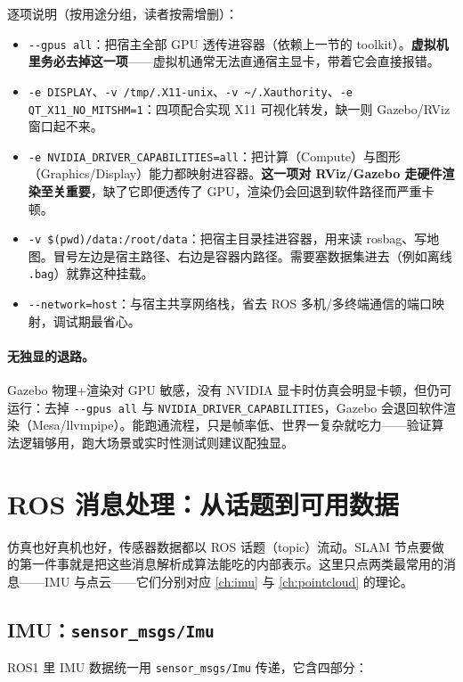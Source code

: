 逐项说明（按用途分组，读者按需增删）：

\begin{itemize}
  \item \verb|--gpus all|：把宿主全部 GPU 透传进容器（依赖上一节的 toolkit）。\textbf{虚拟机里务必去掉这一项}——虚拟机通常无法直通宿主显卡，带着它会直接报错。
  \item \verb|-e DISPLAY|、\verb|-v /tmp/.X11-unix|、\verb|-v ~/.Xauthority|、\verb|-e QT_X11_NO_MITSHM=1|：四项配合实现 X11 可视化转发，缺一则 Gazebo/RViz 窗口起不来。
  \item \verb|-e NVIDIA_DRIVER_CAPABILITIES=all|：把计算（Compute）与图形（Graphics/Display）能力都映射进容器。\textbf{这一项对 RViz/Gazebo 走硬件渲染至关重要}，缺了它即便透传了 GPU，渲染仍会回退到软件路径而严重卡顿。
  \item \verb|-v $(pwd)/data:/root/data|：把宿主目录挂进容器，用来读 rosbag、写地图。冒号左边是宿主路径、右边是容器内路径。需要塞数据集进去（例如离线 \verb|.bag|）就靠这种挂载。
  \item \verb|--network=host|：与宿主共享网络栈，省去 ROS 多机/多终端通信的端口映射，调试期最省心。
\end{itemize}

\paragraph{无独显的退路。}Gazebo 物理+渲染对 GPU 敏感，没有 NVIDIA 显卡时仿真会明显卡顿，但仍可运行：去掉 \verb|--gpus all| 与 \verb|NVIDIA_DRIVER_CAPABILITIES|，Gazebo 会退回软件渲染（Mesa/llvmpipe）。能跑通流程，只是帧率低、世界一复杂就吃力——验证算法逻辑够用，跑大场景或实时性测试则建议配独显。

\section{ROS 消息处理：从话题到可用数据}

仿真也好真机也好，传感器数据都以 ROS 话题（topic）流动。SLAM 节点要做的第一件事就是把这些消息解析成算法能吃的内部表示。这里只点两类最常用的消息——IMU 与点云——它们分别对应 \cref{ch:imu} 与 \cref{ch:pointcloud} 的理论。

\subsection{IMU：\texttt{sensor\_msgs/Imu}}

ROS1 里 IMU 数据统一用 \verb|sensor_msgs/Imu| 传递，它含四部分：

